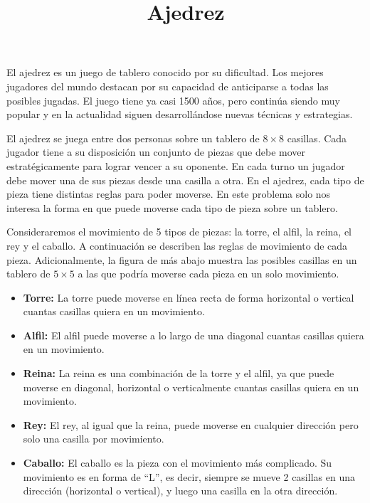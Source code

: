 \documentclass{oci}
\title{Ajedrez}
\begin{document}
\begin{problemDescription}
  El ajedrez es un juego de tablero conocido por su dificultad.
  Los mejores jugadores del mundo destacan por su capacidad de anticiparse a todas las posibles jugadas.
  El juego tiene ya casi 1500 años, pero continúa siendo muy popular y en la actualidad siguen desarrollándose nuevas técnicas y estrategias.
  
  El ajedrez se juega entre dos personas sobre un tablero de $8\times 8$ casillas.
  Cada jugador tiene a su disposición un conjunto de piezas que debe mover estratégicamente para lograr vencer a su oponente.
  En cada turno un jugador debe mover una de sus piezas desde una casilla a otra.
  En el ajedrez, cada tipo de pieza tiene distintas reglas para poder moverse.
  En este problema solo nos interesa la forma en que puede moverse cada tipo de pieza sobre un tablero.
  
  Consideraremos el movimiento de 5 tipos de piezas: la torre, el alfil, la reina, el rey y el caballo.
  A continuación se describen las reglas de movimiento de cada pieza.
  Adicionalmente, la figura de más abajo muestra las posibles casillas en un tablero de $5\times 5$ a las que podría moverse cada pieza en un solo movimiento.
  \begin{itemize}
    \item \textbf{Torre:} La torre puede moverse en línea recta de forma horizontal o vertical cuantas casillas quiera en un movimiento.
    \item \textbf{Alfil:} El alfil puede moverse a lo largo de una diagonal cuantas casillas quiera en un movimiento.
    \item \textbf{Reina:} La reina es una combinación de la torre y el alfil, ya que puede moverse en diagonal, horizontal o verticalmente cuantas casillas quiera en un movimiento.
    \item \textbf{Rey:} El rey, al igual que la reina, puede moverse en cualquier dirección pero solo una casilla por movimiento.
    \item \textbf{Caballo:} El caballo es la pieza con el movimiento más complicado. Su movimiento es en forma de ``L'', es decir, siempre se mueve 2 casillas en una dirección (horizontal o vertical), y luego una casilla en la otra dirección.
  \end{itemize}
  

\end{problemDescription}
\end{document}

